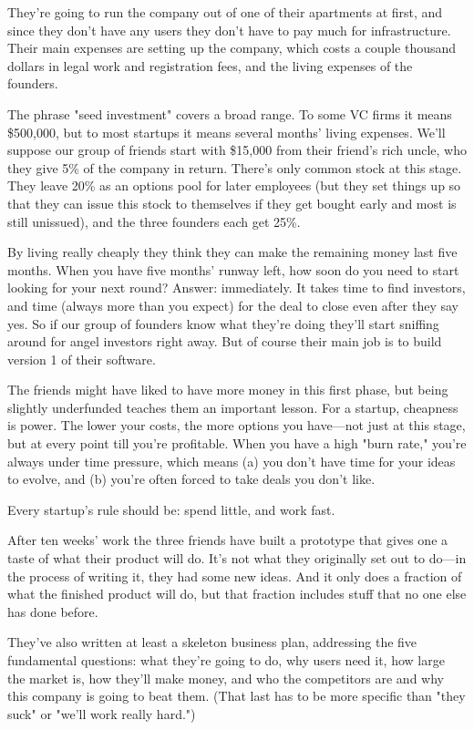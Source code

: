They're going to run the company out of one of their apartments at
first, and since they don't have any users they don't have to pay
much for infrastructure.  Their main expenses are setting up the
company, which costs a couple thousand dollars in legal work and
registration fees, and the living expenses of the founders.

The phrase "seed investment" covers a broad range.  To some VC firms
it means \$500,000, but to most startups it means several months'
living expenses.  We'll suppose our group of friends start with
\$15,000 from their friend's rich uncle, who they give 5\% of the
company in return.  There's only common stock at this stage.  They
leave 20\% as an options pool for later employees (but they set
things up so that they can issue this stock to themselves if they
get bought early and most is still unissued), and the three founders
each get 25\%.

By living really cheaply they think they can make the remaining
money last five months.  When you have five months' runway left,
how soon do you need to start looking for your next round?  Answer:
immediately.  It takes time to find investors, and time (always
more than you expect) for the deal to close even after they say
yes.  So if our group of founders know what they're doing they'll
start sniffing around for angel investors right away.  But of course
their main job is to build version 1 of their software.

The friends might have liked to have more money in this first phase,
but being slightly underfunded teaches them an important lesson.
For a startup, cheapness is power.  The lower your costs, the more
options you have---not just at this stage, but at every point till
you're profitable.  When you have a high "burn rate," you're always
under time pressure, which means (a) you don't have time for your
ideas to evolve, and (b) you're often forced to take deals you don't
like.

Every startup's rule should be: spend little, and work fast.

After ten weeks' work the three friends have built a prototype that
gives one a taste of what their product will do.  It's not what
they originally set out to do---in the process of writing it, they
had some new ideas.  And it only does a fraction of what the finished
product will do, but that fraction includes stuff that no one else
has done before.

They've also written at least a skeleton business plan, addressing
the five fundamental questions: what they're going to do, why users
need it, how large the market is, how they'll make money, and who
the competitors are and why this company is going to beat them.
(That last has to be more specific than "they suck" or "we'll work
really hard.")

